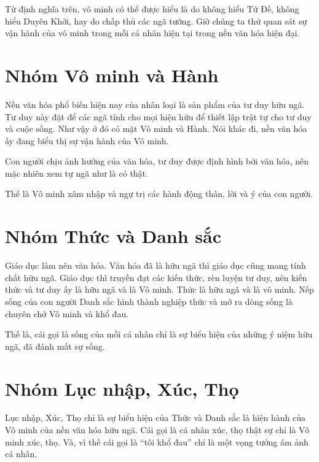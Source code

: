 Từ định nghĩa trên, vô minh có thể được hiểu là do không hiểu Tứ Đế, không hiểu Duyên Khởi, hay do chấp thủ các ngã tướng. Giờ chúng ta thử quan sát sự vận hành của vô minh trong mỗi cá nhân hiện tại trong nền văn hóa hiện đại.

\section{Nhóm Vô minh và Hành} %
\label{sec:vo_minh_va_hanh}

Nền văn hóa phổ biến hiện nay của nhân loại là sản phẩm của tư duy hữu ngã. Tư duy này đặt để các ngã tính cho mọi hiện hữu để thiết lập trật tự cho tư duy và cuộc sống. Như vậy ở đó có mặt Vô minh và Hành. Nói khác đi, nền văn hóa ấy đang biểu thị sự vận hành của Vô minh.

Con người chịu ảnh hưởng của văn hóa, tư duy được định hình bởi văn hóa, nên mặc nhiên xem tự ngã như là có thật.

Thế là Vô minh xâm nhập và ngự trị các hành động thân, lời và ý của con người.


\section{Nhóm Thức và Danh sắc} %
\label{sec:thuc_va_danh_sac}

Giáo dục làm nên văn hóa. Văn hóa đã là hữu ngã thì giáo dục cũng mang tính chất hữu ngã. Giáo dục thì truyền đạt các kiến thức, rèn luyện tư duy, nên kiến thức và tư duy ấy là hữu ngã và là Vô minh. Thức là hữu ngã và là vô minh. Nếp sống của con người Danh sắc hình thành nghiệp thức và mở ra dòng sống là chuyên chở Vô minh và khổ đau.

Thế là, cái gọi là sống của mỗi cá nhân chỉ là sự biểu hiện của những ý niệm hữu ngã, đã đánh mất sự sống.


\section{Nhóm Lục nhập, Xúc, Thọ} %
\label{sec:luc_nhap_xuc_tho}

Lục nhập, Xúc, Thọ chỉ là sự biểu hiện của Thức và Danh sắc là hiện hành của Vô minh của nền văn hóa hữu ngã. Cái gọi là cá nhân xúc, thọ thật sự chỉ là Vô minh xúc, thọ. Và, vì thế cái gọi là ``tôi khổ đau'' chỉ là một vọng tưởng ám ảnh cá nhân.

